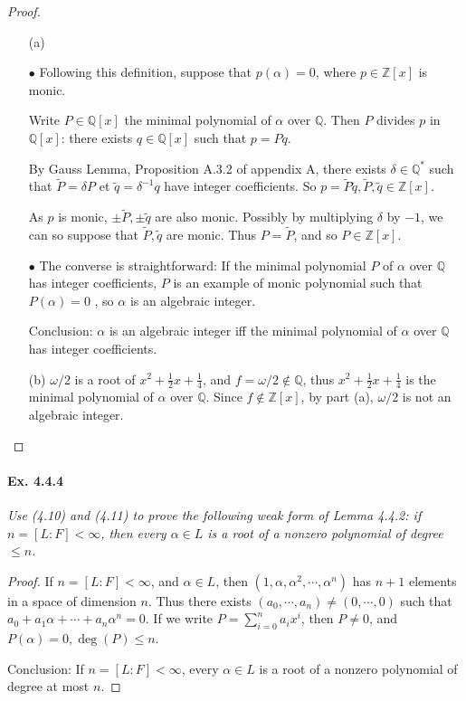 \documentclass[11pt,a4paper]{article}
\newcommand{\Q}{\mathbb{Q}}
\newcommand{\Z}{\mathbb{Z}}
\begin{document}
\begin{proof}
\begin{enumerate}
\item[(a)]

$\bullet$ Following this definition, suppose that $p(\alpha) = 0$, where $p\in \mathbb{Z}[x]$ is monic.

Write $P\in \Q[x]$ the minimal polynomial of $\alpha$ over $\Q$. Then $P$ divides $p$ in $\Q[x]$: there exists $q \in \Q[x]$ such that $p = P q$.

By Gauss Lemma, Proposition A.3.2 of appendix A, there exists $\delta \in \mathbb{\Q}^*$ such that $\tilde{P} =\delta P$ et $\tilde{q} = \delta^{-1} q$ have integer coefficients. So $p = \tilde{P} \tilde{q}, \tilde{P}, \tilde{q} \in \Z[x]$.

As $p$ is monic, $\pm \tilde{P},\pm \tilde{q}$ are also monic. Possibly by multiplying  $\delta$ by $-1$, we can so suppose that $ \tilde{P}, \tilde{q}$ are monic. Thus $P = \tilde{P}$, and so $P \in \mathbb{Z}[x]$.

$\bullet$ The converse is straightforward: If the minimal polynomial $P$ of $\alpha$ over $\Q$ has integer coefficients, $P$ is an example of monic polynomial such that $P(\alpha) = 0$ , so $\alpha$ is an algebraic integer.

Conclusion:  $\alpha$ is an algebraic integer iff the minimal polynomial of $\alpha$ over $\Q$ has integer coefficients.


\item[(b)]
$\omega/2$ is a root of $  x^2 +\frac{1}{2}x + \frac{1}{4}$, and $f = \omega /2 \not \in \mathbb{Q}$, thus $  x^2 +\frac{1}{2}x + \frac{1}{4}$ is the minimal polynomial of $\alpha$ over $\Q$. Since $f \not \in \Z[x]$, by part (a), $\omega/2$ is not an algebraic integer.

\end{enumerate}
\end{proof}

\paragraph{Ex. 4.4.4}

{\it Use (4.10) and (4.11) to prove the following weak form of Lemma 4.4.2: if $n = [L:F] < \infty$, then every $\alpha \in L$ is a root of a nonzero polynomial of degree $\leq n$.
}

\begin{proof}
If $n = [L:F] < \infty$, and $\alpha \in L$, then $(1, \alpha,\alpha^2, \cdots,\alpha^n)$ has $n+1$ elements in a space of dimension $n$.
Thus there exists $(a_0,\cdots,a_n) \neq (0,\cdots,0)$ such that $a_0 + a_1\alpha+\cdots+a_n \alpha^n = 0$. If we write $P = \sum_{i=0}^n a_ix^i$, then $P\neq 0$, and $P(\alpha) = 0, \deg(P)\leq n$.

Conclusion: If $n = [L:F] < \infty$, every $\alpha \in L$ is a root of a nonzero polynomial of degree at most $n$.

\end{proof}
\end{document}
